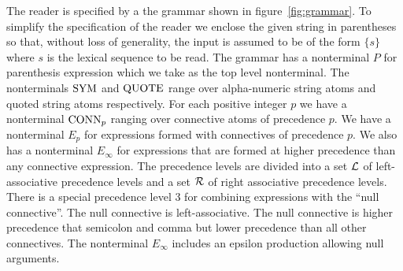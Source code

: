 \documentclass{article}
\begin{document}
The reader is specified by a the grammar shown in figure~\ref{fig:grammar}.
To simplify the specification of the reader we enclose the given string in parentheses so that, without loss of generality, the input is assumed to be of the form
$\{s\}$ where $s$ is the lexical sequence to be read.  The grammar has a nonterminal $P$ for parenthesis expression which we take as the top level nonterminal.
The nonterminals $\mathrm{SYM}$ and $\mathrm{QUOTE}$ range over alpha-numeric string atoms and quoted string atoms respectively.
For each positive integer $p$ we have a nonterminal $\mathrm{CONN}_p$ ranging over connective atoms of precedence $p$.
We have a nonterminal $E_p$ for expressions formed with connectives
of precedence $p$.  We also has a nonterminal $E_\infty$ for expressions that are formed at higher precedence than any connective expression.
The precedence levels are divided into a set ${\cal L}$ of left-associative precedence levels and a set ${\cal R}$ of right associative precedence levels.
There is a special precedence level 3 for combining expressions with the ``null connective''. The null connective is left-associative.
The null connective is higher precedence that semicolon and comma but lower precedence than all other connectives.
The nonterminal $E_\infty$ includes an epsilon production allowing null arguments.
\end{document}
